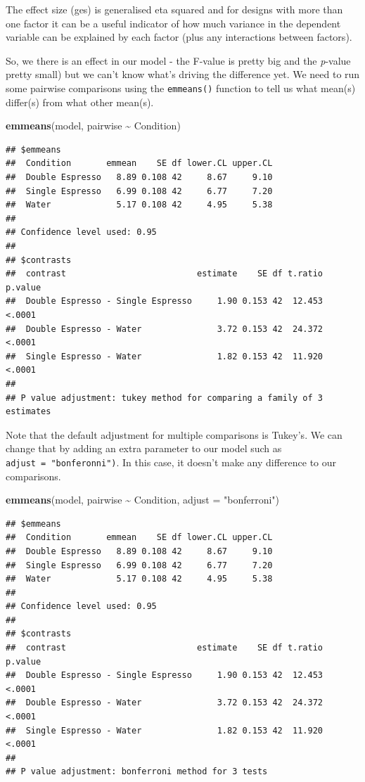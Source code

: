 \documentclass[
]{book}
\newenvironment{Shaded}{\begin{snugshade}}{\end{snugshade}}
\newcommand{\AttributeTok}[1]{\textcolor[rgb]{0.13,0.29,0.53}{#1}}
\newcommand{\FunctionTok}[1]{\textcolor[rgb]{0.13,0.29,0.53}{\textbf{#1}}}
\newcommand{\NormalTok}[1]{#1}
\newcommand{\SpecialCharTok}[1]{\textcolor[rgb]{0.81,0.36,0.00}{\textbf{#1}}}
\newcommand{\StringTok}[1]{\textcolor[rgb]{0.31,0.60,0.02}{#1}}
\begin{document}
The effect size (ges) is generalised eta squared and for designs with more than one factor it can be a useful indicator of how much variance in the dependent variable can be explained by each factor (plus any interactions between factors).

So, we there is an effect in our model - the F-value is pretty big and the \emph{p}-value pretty small) but we can't know what's driving the difference yet. We need to run some pairwise comparisons using the \texttt{emmeans()} function to tell us what mean(s) differ(s) from what other mean(s).

\begin{Shaded}
\begin{Highlighting}[]
\FunctionTok{emmeans}\NormalTok{(model, pairwise }\SpecialCharTok{\textasciitilde{}}\NormalTok{ Condition)}
\end{Highlighting}
\end{Shaded}

\begin{verbatim}
## $emmeans
##  Condition       emmean    SE df lower.CL upper.CL
##  Double Espresso   8.89 0.108 42     8.67     9.10
##  Single Espresso   6.99 0.108 42     6.77     7.20
##  Water             5.17 0.108 42     4.95     5.38
## 
## Confidence level used: 0.95 
## 
## $contrasts
##  contrast                          estimate    SE df t.ratio p.value
##  Double Espresso - Single Espresso     1.90 0.153 42  12.453  <.0001
##  Double Espresso - Water               3.72 0.153 42  24.372  <.0001
##  Single Espresso - Water               1.82 0.153 42  11.920  <.0001
## 
## P value adjustment: tukey method for comparing a family of 3 estimates
\end{verbatim}

Note that the default adjustment for multiple comparisons is Tukey's. We can change that by adding an extra parameter to our model such as \texttt{adjust\ =\ "bonferonni")}. In this case, it doesn't make any difference to our comparisons.

\begin{Shaded}
\begin{Highlighting}[]
\FunctionTok{emmeans}\NormalTok{(model, pairwise }\SpecialCharTok{\textasciitilde{}}\NormalTok{ Condition, }\AttributeTok{adjust =} \StringTok{"bonferroni"}\NormalTok{)}
\end{Highlighting}
\end{Shaded}

\begin{verbatim}
## $emmeans
##  Condition       emmean    SE df lower.CL upper.CL
##  Double Espresso   8.89 0.108 42     8.67     9.10
##  Single Espresso   6.99 0.108 42     6.77     7.20
##  Water             5.17 0.108 42     4.95     5.38
## 
## Confidence level used: 0.95 
## 
## $contrasts
##  contrast                          estimate    SE df t.ratio p.value
##  Double Espresso - Single Espresso     1.90 0.153 42  12.453  <.0001
##  Double Espresso - Water               3.72 0.153 42  24.372  <.0001
##  Single Espresso - Water               1.82 0.153 42  11.920  <.0001
## 
## P value adjustment: bonferroni method for 3 tests
\end{verbatim}
\end{document}
